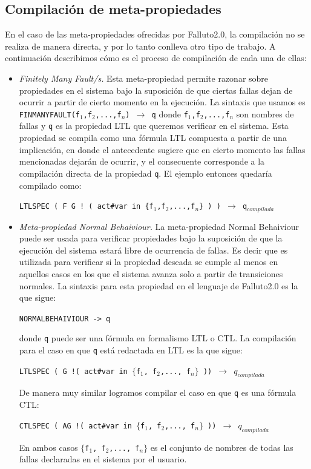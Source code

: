 \documentclass[pdftex,a4paper,12pt]{book}
\begin{document}
\subsection*{Compilaci\'on de meta-propiedades}
En el caso de las meta-propiedades ofrecidas por Falluto2.0, la compilaci\'on no se realiza de manera directa, y por lo tanto conlleva otro tipo de trabajo. A continuaci\'on describimos c\'omo es el proceso de compilaci\'on de cada una de ellas:
\begin{itemize}
\item \textit{Finitely Many Fault/s.} Esta meta-propiedad permite razonar sobre propiedades en el sistema bajo la suposici\'on de que ciertas fallas dejan de ocurrir a partir de cierto momento en la ejecuci\'on. La sintaxis que usamos es \texttt{FINMANYFAULT(f$_1$,f$_2$,...,f$_n$) $\rightarrow$ q} donde \texttt{f$_1$,f$_2$,...,f$_n$} son nombres de fallas y \texttt{q} es la propiedad LTL que queremos verificar en el sistema. Esta propiedad se compila como una f\'ormula LTL compuesta a partir de una implicaci\'on, en donde el antecedente sugiere que en cierto momento las fallas mencionadas dejar\'an de ocurrir, y el consecuente corresponde a la compilaci\'on directa de la propiedad \texttt{q}. El ejemplo entonces quedar\'ia compilado como:
\begin{center}
\texttt{LTLSPEC~(~F~G~!~(~act\#var~in~\{f$_1$,f$_2$,...,f$_n$\}~)~)~$\rightarrow$~q$_{compilada}$}
\end{center}
\item \textit{Meta-propiedad Normal Behaiviour.} La meta-propiedad Normal Behaiviour puede ser usada para verificar propiedades bajo la suposici\'on de que la ejecuci\'on del sistema estar\'a libre de ocurrencia de fallas. Es decir que es utilizada para verificar si la propiedad deseada se cumple al menos en aquellos casos en los que el sistema avanza solo a partir de transiciones normales. La sintaxis para esta propiedad en el lenguaje de Falluto2.0 es la que sigue: \begin{center}\texttt{NORMALBEHAIVIOUR -> q}\end{center} donde \texttt{q} puede ser una f\'ormula en formalismo LTL o CTL. La compilaci\'on para el caso en que \texttt{q} est\'a redactada en LTL es la que sigue:
\begin{center}
\texttt{LTLSPEC~(~G~!(~act\#var~in~$\lbrace$f$_1$, f$_2$,..., f$_n \rbrace$~))~$\rightarrow$~$q_{compilada}$}
\end{center}
De manera muy similar logramos compilar el caso en que \texttt{q} es una f\'ormula CTL:
\begin{center}
\texttt{CTLSPEC~(~AG~!(~act\#var~in~$\lbrace$f$_1$, f$_2$,..., f$_n \rbrace$~))~$\rightarrow$~$q_{compilada}$}
\end{center}
En ambos casos \texttt{$\lbrace$f$_1$, f$_2$,..., f$_n \rbrace$} es el conjunto de nombres de todas las fallas declaradas en el sistema por el usuario.
\end{itemize}
\end{document}
